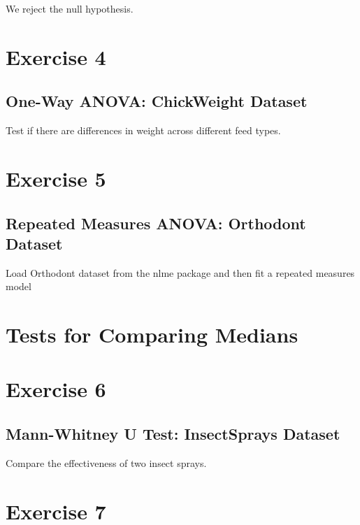 \documentclass[
]{book}
\begin{document}
We reject the null hypothesis.

\section*{Exercise 4}\label{exercise-4-3}

\subsection*{One-Way ANOVA: ChickWeight Dataset}\label{one-way-anova-chickweight-dataset}

Test if there are differences in weight across different feed types.

\section*{Exercise 5}\label{exercise-5-3}

\subsection*{Repeated Measures ANOVA: Orthodont Dataset}\label{repeated-measures-anova-orthodont-dataset}

Load Orthodont dataset from the nlme package and then fit a repeated measures model

\section{Tests for Comparing Medians}\label{tests-for-comparing-medians}

\section*{Exercise 6}\label{exercise-6}

\subsection{Mann-Whitney U Test: InsectSprays Dataset}\label{mann-whitney-u-test-insectsprays-dataset}

Compare the effectiveness of two insect sprays.

\section*{Exercise 7}\label{exercise-7}
\end{document}

